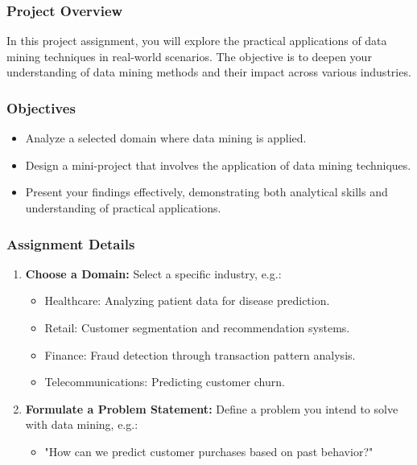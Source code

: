 \documentclass[aspectratio=169]{beamer}
\begin{document}
\begin{frame}[fragile]
    \frametitle{Project Overview}
    In this project assignment, you will explore the practical applications of data mining techniques in real-world scenarios. The objective is to deepen your understanding of data mining methods and their impact across various industries.
\end{frame}

\begin{frame}[fragile]
    \frametitle{Objectives}
    \begin{itemize}
        \item Analyze a selected domain where data mining is applied.
        \item Design a mini-project that involves the application of data mining techniques.
        \item Present your findings effectively, demonstrating both analytical skills and understanding of practical applications.
    \end{itemize}
\end{frame}

\begin{frame}[fragile]
    \frametitle{Assignment Details}
    \begin{enumerate}
        \item \textbf{Choose a Domain:} Select a specific industry, e.g.:
        \begin{itemize}
            \item Healthcare: Analyzing patient data for disease prediction.
            \item Retail: Customer segmentation and recommendation systems.
            \item Finance: Fraud detection through transaction pattern analysis.
            \item Telecommunications: Predicting customer churn.
        \end{itemize}

        \item \textbf{Formulate a Problem Statement:} Define a problem you intend to solve with data mining, e.g.:
        \begin{itemize}
            \item "How can we predict customer purchases based on past behavior?"
        \end{itemize}
    \end{enumerate}
\end{frame}
\end{document}
